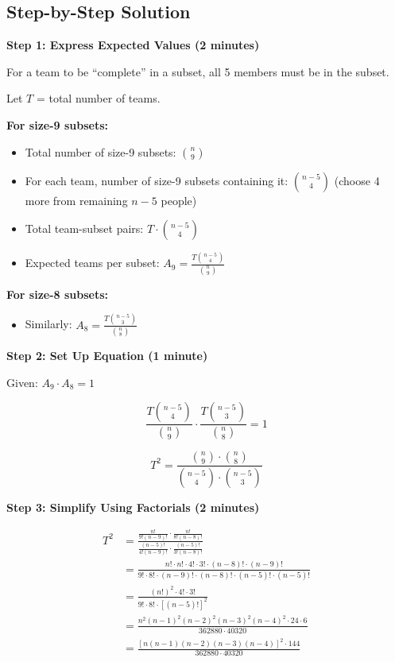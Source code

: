 \documentclass[]{article}
\begin{document}
	\begin{solutionbox}
		\subsection*{Step-by-Step Solution}
		
		\textbf{Step 1: Express Expected Values (2 minutes)}
		
		For a team to be ``complete'' in a subset, all 5 members must be in the subset.
		
		Let $T$ = total number of teams.
		
		\textbf{For size-9 subsets:}
		\begin{itemize}[nosep]
			\item Total number of size-9 subsets: $\binom{n}{9}$
			\item For each team, number of size-9 subsets containing it: $\binom{n-5}{4}$ (choose 4 more from remaining $n-5$ people)
			\item Total team-subset pairs: $T \cdot \binom{n-5}{4}$
			\item Expected teams per subset: $A_9 = \frac{T\binom{n-5}{4}}{\binom{n}{9}}$
		\end{itemize}
		
		\textbf{For size-8 subsets:}
		\begin{itemize}[nosep]
			\item Similarly: $A_8 = \frac{T\binom{n-5}{3}}{\binom{n}{8}}$
		\end{itemize}
		
		\textbf{Step 2: Set Up Equation (1 minute)}
		
		Given: $A_9 \cdot A_8 = 1$
		
		\[
		\frac{T\binom{n-5}{4}}{\binom{n}{9}} \cdot \frac{T\binom{n-5}{3}}{\binom{n}{8}} = 1
		\]
		
		\[
		T^2 = \frac{\binom{n}{9} \cdot \binom{n}{8}}{\binom{n-5}{4} \cdot \binom{n-5}{3}}
		\]
		
		\textbf{Step 3: Simplify Using Factorials (2 minutes)}
		
		\begin{align*}
			T^2 &= \frac{\frac{n!}{9!(n-9)!} \cdot \frac{n!}{8!(n-8)!}}{\frac{(n-5)!}{4!(n-9)!} \cdot \frac{(n-5)!}{3!(n-8)!}} \\
			&= \frac{n! \cdot n! \cdot 4! \cdot 3! \cdot (n-8)! \cdot (n-9)!}{9! \cdot 8! \cdot (n-9)! \cdot (n-8)! \cdot (n-5)! \cdot (n-5)!} \\
			&= \frac{(n!)^2 \cdot 4! \cdot 3!}{9! \cdot 8! \cdot [(n-5)!]^2} \\
			&= \frac{n^2(n-1)^2(n-2)^2(n-3)^2(n-4)^2 \cdot 24 \cdot 6}{362880 \cdot 40320} \\
			&= \frac{[n(n-1)(n-2)(n-3)(n-4)]^2 \cdot 144}{362880 \cdot 40320}
		\end{align*}
		

\end{solutionbox}
\end{document}
